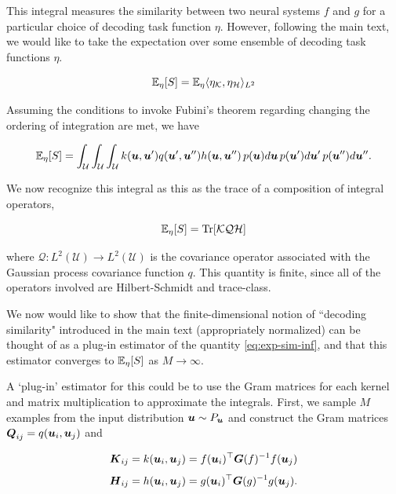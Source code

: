 This integral measures the similarity between two neural systems $f$ and $g$ for a particular choice of decoding task function $\eta$.  
However, following the main text, we would like to take the expectation over some ensemble of decoding task functions $\eta$.

\begin{equation}
       \mathbb{E}_{\eta}[S] = \mathbb{E}_{\eta} \langle \eta_{\mathcal{K}}, \eta_{\mathcal{H}} \rangle_{L^2}
\end{equation}

Assuming the conditions to invoke Fubini's theorem regarding changing the ordering of integration are met, we have 

\begin{equation}
    \mathbb{E}_{\eta}[S] =\int_{\mathcal{U}} \int_{\mathcal{U}} \int_{\mathcal{U}} k(\boldsymbol{u}, \boldsymbol{u}') q(\boldsymbol{u}', \boldsymbol{u}'') h(\boldsymbol{u}, \boldsymbol{u}'')\, p(\boldsymbol{u}) d\boldsymbol{u} \,p(\boldsymbol{u}') d\boldsymbol{u}'\, p(\boldsymbol{u}'') d\boldsymbol{u}''.
\end{equation}

We now recognize this integral as this as the trace of a composition of integral operators, 

\begin{equation}\label{eq:exp-sim-inf}
    \expect_{\eta}[S] = \Tr [\mathcal{K}\mathcal{Q} \mathcal{H}] %
\end{equation}

where $\mathcal{Q}: L^2(\mathcal{U}) \rightarrow L^2(\mathcal{U})$ is the covariance operator associated with the Gaussian process covariance function $q$.  
This quantity is finite, since all of the operators involved are Hilbert-Schmidt and trace-class.  

We now would like to show that the finite-dimensional notion of ``decoding similarity" introduced in the main text (appropriately normalized) can be thought of as a plug-in estimator of the quantity \cref{eq:exp-sim-inf}, and that this estimator converges to $\mathbb{E}_{\eta}[S]$ as $M \rightarrow \infty$.



A `plug-in' estimator for this could be to use the Gram matrices for each kernel and matrix multiplication to approximate the integrals.
First, we sample $M$ examples from the input distribution $\boldsymbol{u} \sim P_{\boldsymbol{u}}$ and construct the Gram matrices $\boldsymbol{Q}_{ij} = q(\boldsymbol{u}_i, \boldsymbol{u}_j)$ and

\begin{equation}\label{eq:Kkernel}
    \boldsymbol{K}_{ij} = k(\boldsymbol{u}_i, \boldsymbol{u}_j) = f(\boldsymbol{u}_i)^\top \boldsymbol{G}(f)^{-1} f(\boldsymbol{u}_j) 
\end{equation}
\begin{equation}\label{eq:Hkernel}
\boldsymbol{H}_{ij} = h(\boldsymbol{u}_i, \boldsymbol{u}_j) = g(\boldsymbol{u}_i)^\top \boldsymbol{G}(g)^{-1} g(\boldsymbol{u}_j).
\end{equation}

